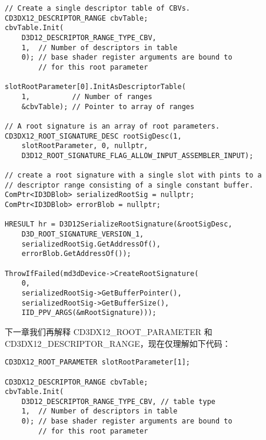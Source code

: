 \begin{flushleft}
\begin{lstlisting}
// Create a single descriptor table of CBVs.
CD3DX12_DESCRIPTOR_RANGE cbvTable;
cbvTable.Init(
    D3D12_DESCRIPTOR_RANGE_TYPE_CBV,
    1,  // Number of descriptors in table
    0); // base shader register arguments are bound to 
        // for this root parameter

slotRootParameter[0].InitAsDescriptorTable(
    1,          // Number of ranges
    &cbvTable); // Pointer to array of ranges

// A root signature is an array of root parameters.
CD3DX12_ROOT_SIGNATURE_DESC rootSigDesc(1, 
    slotRootParameter, 0, nullptr, 
    D3D12_ROOT_SIGNATURE_FLAG_ALLOW_INPUT_ASSEMBLER_INPUT);

// create a root signature with a single slot with pints to a
// descriptor range consisting of a single constant buffer.
ComPtr<ID3DBlob> serializedRootSig = nullptr;
ComPtr<ID3DBlob> errorBlob = nullptr;

HRESULT hr = D3D12SerializeRootSignature(&rootSigDesc, 
    D3D_ROOT_SIGNATURE_VERSION_1,
    serializedRootSig.GetAddressOf(),
    errorBlob.GetAddressOf());

ThrowIfFailed(md3dDevice->CreateRootSignature(
    0,
    serializedRootSig->GetBufferPointer(),
    serializedRootSig->GetBufferSize(),
    IID_PPV_ARGS(&mRootSignature)));
\end{lstlisting}
下一章我们再解释 CD3DX12\_ROOT\_PARAMETER 和 CD3DX12\_DESCRIPTOR\_RANGE，现在仅理解如下代码：\\
\begin{lstlisting}
CD3DX12_ROOT_PARAMETER slotRootParameter[1];

CD3DX12_DESCRIPTOR_RANGE cbvTable;
cbvTable.Init(
    D3D12_DESCRIPTOR_RANGE_TYPE_CBV, // table type
    1,  // Number of descriptors in table
    0); // base shader register arguments are bound to 
        // for this root parameter


\end{lstlisting}
\end{flushleft}
